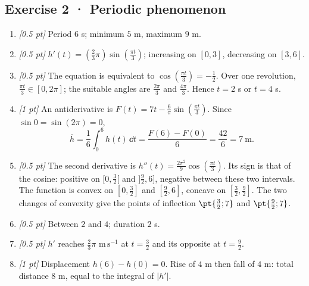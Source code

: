\subsection*{Exercise 2 · Periodic phenomenon}\begin{enumerate}

\item \textit{[0.5 pt]} Period $6$ s; minimum $5$ m, maximum $9$ m.

\item \textit{[0.5 pt]} $h'(t)=(\frac{2}{3}\pi)\sin (\frac{\pi t}{3})$; increasing on $[0,3]$, decreasing on $[3,6]$.

\item \textit{[0.5 pt]} The equation is equivalent to $\cos (\frac{\pi t}{3})=-\frac{1}{2}$. Over one revolution, $\frac{\pi t}{3}\in[0,2\pi]$; the suitable angles are $\frac{2\pi}{3}$ and $\frac{4\pi}{3}$. Hence $t=2$ s or $t=4$ s.

\item \textit{[1 pt]} An antiderivative is $F(t)=7t-\frac{6}{\pi}\sin (\frac{\pi t}{3})$. Since $\sin0=\sin(2\pi)=0$,
\[\overline h=\frac{1}{6}\int_0^{6}h(t)\,\dd t=\frac{F(6)-F(0)}{6}=\frac{42}{6}=7\ \mathrm{m}.\]

\item \textit{[0.5 pt]} The second derivative is $h''(t)=\frac{2\pi^2}{9}\cos (\frac{\pi t}{3})$. Its sign is that of the cosine: positive on $[0,\frac{3}{2}[$ and $]\frac{9}{2},6]$, negative between these two intervals. The function is convex on $[0,\frac{3}{2}]$ and $[\frac{9}{2},6]$, concave on $[\frac{3}{2},\frac{9}{2}]$. The two changes of convexity give the points of inflection $\pt{\frac{3}{2};7}$ and $\pt{\frac{9}{2};7}$.

\item \textit{[0.5 pt]} Between $2$ and $4$; duration $2$ s.

\item \textit{[0.5 pt]} $h'$ reaches $\frac{2}{3}\pi$ $\mathrm{m\,s^{-1}}$ at $t=\frac{3}{2}$ and its opposite at $t=\frac{9}{2}$.

\item \textit{[1 pt]} Displacement $h(6)-h(0)=0$. Rise of $4$ m then fall of $4$ m: total distance $8$ m, equal to the integral of $|h'|$.

\end{enumerate}

